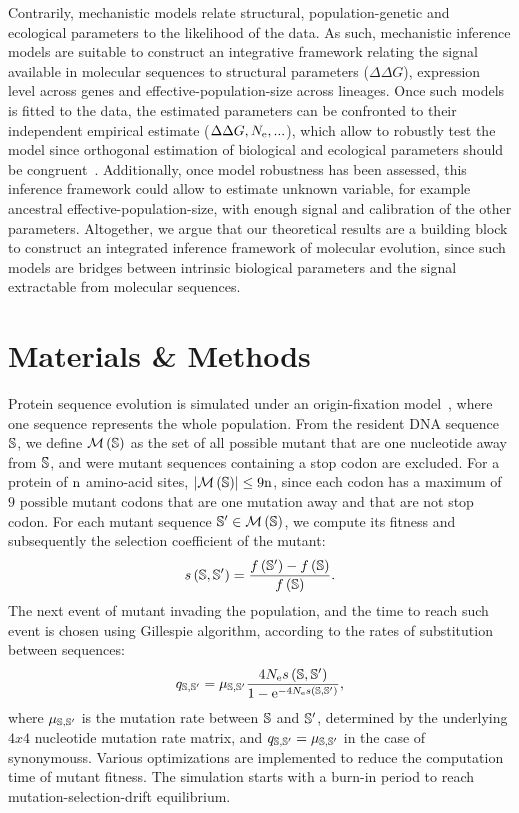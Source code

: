 Contrarily, mechanistic models relate structural, population-genetic and ecological parameters to the \gls{likelihood} of the data.
As such, mechanistic inference models are suitable to construct an integrative framework relating the signal available in molecular sequences to structural parameters ($\Delta \Delta G$), expression level across genes and \gls{effective-population-size} across lineages.
Once such models is fitted to the data, the estimated parameters can be confronted to their independent empirical estimate ($\Delta \Delta G, N_{\mathrm{e}}, ...$), which allow to robustly test the model since orthogonal estimation of biological and ecological parameters should be congruent~\citep{Dasmeh2014}.
Additionally, once model robustness has been assessed, this inference framework could allow to estimate unknown variable, for example ancestral \gls{effective-population-size}, with enough signal and calibration of the other parameters. 
Altogether, we argue that our theoretical results are a building block to construct an integrated inference framework of molecular evolution, since such models are bridges between intrinsic biological parameters and the signal extractable from molecular sequences.

\section{Materials \& Methods}
Protein sequence evolution is simulated under an origin-fixation model~\citep{McCandlish2014}, where one sequence represents the whole population.
From the resident \acrshort{DNA} sequence $\mathbb{S}$, we define $\mathcal{M}\left(\mathbb{S}\right)$ as the set of all possible mutant that are one nucleotide away from $\mathbb{S}$, and were mutant sequences containing a stop \gls{codon} are excluded.
For a protein of $\text{n}$ amino-acid sites, $\left| \mathcal{M}\left(\mathbb{S}\right) \right| \leq 9 \text{n}$, since each \gls{codon} has a maximum of $9$ possible mutant \glspl{codon} that are one mutation away and that are not stop \gls{codon}.
For each mutant sequence $\mathbb{S}' \in \mathcal{M}\left(\mathbb{S}\right)$, we compute its fitness and subsequently the selection coefficient of the mutant:
\begin{equation}
s \left( \mathbb{S},\mathbb{S}'\right) = \dfrac{ f \left(\mathbb{S}' \right) - f \left(\mathbb{S}\right) }{f\left( \mathbb{S}\right)}.
\end{equation}
The next event of mutant invading the population, and the time to reach such event is chosen using Gillespie algorithm, according to the rates of \gls{substitution} between sequences:
\begin{equation}
q_{\mathbb{S}, \mathbb{S}'} = \mu_{\mathbb{S}, \mathbb{S}'} \dfrac{4 N_{\mathrm{e}} s \left( \mathbb{S},\mathbb{S}'\right)}{1 - \mathrm{e}^{-4 N_{\mathrm{e}} s \left( \mathbb{S},\mathbb{S}'\right)}}, 
\end{equation}
where $\mu_{\mathbb{S}, \mathbb{S}'}$ is the mutation rate between $\mathbb{S}$ and $\mathbb{S}'$, determined by the underlying $4x4$ nucleotide mutation rate matrix, and ${q_{\mathbb{S}, \mathbb{S}'}} = \mu_{\mathbb{S}, \mathbb{S}'}$ in the case of \glspl{synonymous}.
Various optimizations are implemented to reduce the computation time of mutant fitness.
The simulation starts with a burn-in period to reach mutation-selection-drift equilibrium.

